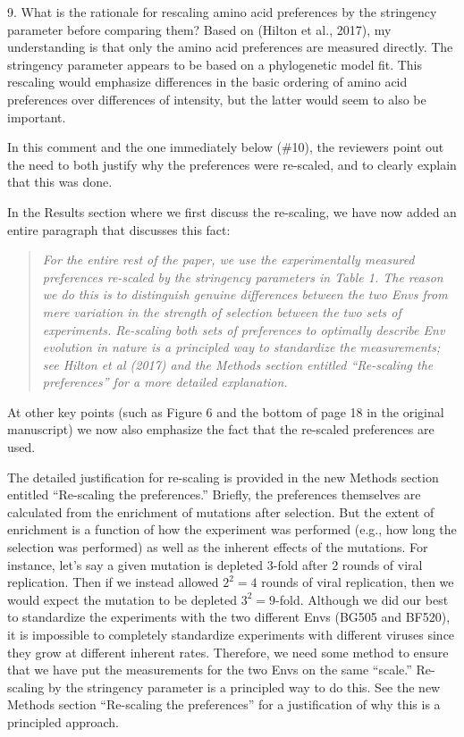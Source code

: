 \documentclass[11pt, oneside]{article}   	%
\begin{document}
9. What is the rationale for rescaling amino acid preferences by the stringency parameter before comparing them? Based on (Hilton et al., 2017), my understanding is that only the amino acid preferences are measured directly. The stringency parameter appears to be based on a phylogenetic model fit. This rescaling would emphasize differences in the basic ordering of amino acid preferences over differences of intensity, but the latter would seem to also be important. 

{\color{black}
In this comment and the one immediately below (\#10), the reviewers point out the need to both justify why the preferences were re-scaled, and to clearly explain that this was done.

In the Results section where we first discuss the re-scaling, we have now added an entire paragraph that discusses this fact:
\begin{quote}
\textsl{For the entire rest of the paper, we use the experimentally measured preferences re-scaled by the stringency parameters in Table 1.
The reason we do this is to distinguish genuine differences between the two Envs from mere variation in the strength of selection between the two sets of experiments.
Re-scaling both sets of preferences to optimally describe Env evolution in nature is a principled way to standardize the measurements; see Hilton et al (2017) and the Methods section entitled ``Re-scaling the preferences'' for a more detailed explanation.}
\end{quote}
At other key points (such as Figure 6 and the bottom of page 18 in the original manuscript) we now also emphasize the fact that the re-scaled preferences are used.

The detailed justification for re-scaling is provided in the new Methods section entitled ``Re-scaling the preferences.''
Briefly, the preferences themselves are calculated from the enrichment of mutations after selection.
But the extent of enrichment is a function of how the experiment was performed (e.g., how long the selection was performed) as well as the inherent effects of the mutations. 
For instance, let's say a given mutation is depleted 3-fold after 2 rounds of viral replication. 
Then if we instead allowed $2^2 = 4$ rounds of viral replication, then we would expect the mutation to be depleted $3^2 = 9$-fold.
Although we did our best to standardize the experiments with the two different Envs (BG505 and BF520), it is impossible to completely standardize experiments with different viruses since they grow at different inherent rates.
Therefore, we need some method to ensure that we have put the measurements for the two Envs on the same ``scale.''
Re-scaling by the stringency parameter is a principled way to do this.
See the new Methods section ``Re-scaling the preferences'' for a justification of why this is a principled approach.
}
\end{document}
